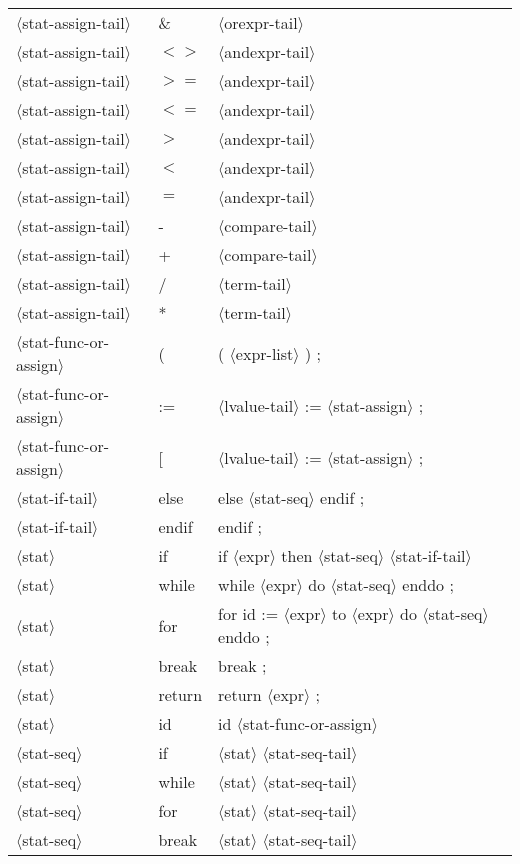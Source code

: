 \documentclass[11pt, fleqn]{article}
\newcommand{\atag}[1]{$\langle$#1$\rangle$}
\begin{document}
\begin{longtable}{l|l|l}
\atag{stat-assign-tail}			&	\&			&	\atag{orexpr-tail}	\\
\atag{stat-assign-tail}			&	$<>$			&	\atag{andexpr-tail}	\\
\atag{stat-assign-tail}			&	$>=$			&	\atag{andexpr-tail}	\\
\atag{stat-assign-tail}			&	$<=$			&	\atag{andexpr-tail}	\\
\atag{stat-assign-tail}			&	$>$			&	\atag{andexpr-tail}	\\
\atag{stat-assign-tail}			&	$<$			&	\atag{andexpr-tail}	\\
\atag{stat-assign-tail}			&	$=$			&	\atag{andexpr-tail}	\\
\atag{stat-assign-tail}			&	-			&	\atag{compare-tail}	\\
\atag{stat-assign-tail}			&	+			&	\atag{compare-tail}	\\
\atag{stat-assign-tail}			&	/			&	\atag{term-tail}	\\
\atag{stat-assign-tail}			&	*			&	\atag{term-tail}	\\
\atag{stat-func-or-assign}		&	(		&	( \atag{expr-list} ) ;	\\
\atag{stat-func-or-assign}		&	:=		&	\atag{lvalue-tail} := \atag{stat-assign}	;	\\
\atag{stat-func-or-assign}		&	[		&	\atag{lvalue-tail} := \atag{stat-assign}	;	\\
\atag{stat-if-tail}				&	else		&	else \atag{stat-seq} endif ;	\\
\atag{stat-if-tail}				&	endif	&	endif ;	\\
\atag{stat}						&	if		&	if \atag{expr} then \atag{stat-seq} \atag{stat-if-tail}		\\
\atag{stat}						&	while	&	while \atag{expr} do \atag{stat-seq} enddo ;		\\
\atag{stat}						&	for		&	for id := \atag{expr} to \atag{expr} do \atag{stat-seq} enddo ;		\\
\atag{stat}						&	break	&	break ;			\\
\atag{stat}						&	return	&	return \atag{expr} ;		\\
\atag{stat}						&	id		&	id \atag{stat-func-or-assign}		\\
\atag{stat-seq}					&	if		&	\atag{stat} \atag{stat-seq-tail}		\\
\atag{stat-seq}					&	while	&	\atag{stat} \atag{stat-seq-tail}		\\
\atag{stat-seq}					&	for		&	\atag{stat} \atag{stat-seq-tail}		\\
\atag{stat-seq}					&	break	&	\atag{stat} \atag{stat-seq-tail}		\\

\end{longtable}
\end{document}
